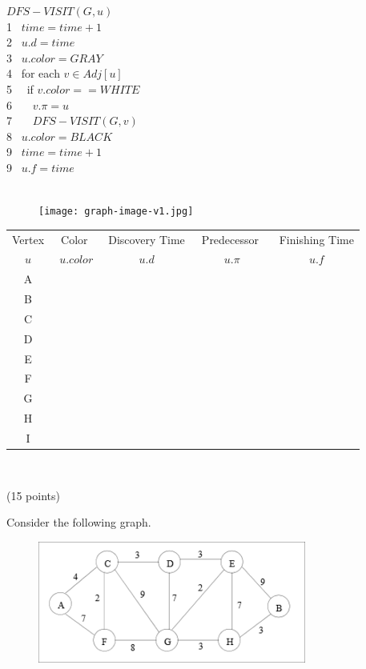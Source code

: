 \documentclass[12pt]{article}
\newcommand{\vs}{\vspace{2mm}}
\newcommand{\ha}{\hspace{5mm}}
\begin{document}
$DFS-VISIT(G,u)$ \\
1 \ha\ $time = time + 1$ \\
2 \ha\ $u.d = time$ \\
3 \ha\ $u.color = GRAY$ \\
4 \ha\ for each $v \in Adj[u] $ \\
5  \ha\ \ha\ if $v.color == WHITE$ \\
6 \ha\ \ha\ \ha\ $v.\pi= u$\\
7  \ha\ \ha\ \ha\ $DFS-VISIT(G,v)$ \\
8 \ha\  $u.color = BLACK$ \\
9 \ha\  $ time= time+1 $\\
9 \ha\  $ u.f = time $\\ \\

\begin{figure}[!h]
    \centering
    \texttt{[image: graph-image-v1.jpg]}
\end{figure}

\begin{tabular}{|c|c|c|c|c|} \hline
  Vertex  &  \ha\  Color  \ha\ &   Discovery Time  & \ha\ Predecessor \ha\  & Finishing Time \\
  $u$ & $u.color$ & $u.d$ & $u.\pi$ & $ u.f$\\ \hline
  A & & & & \\ \hline
  B & & & &\\ \hline
  C & & & &\\ \hline
  D & & & &\\ \hline
  E & & & & \\ \hline
  F & & & &\\ \hline
  G & & & &\\ \hline
  H & & & &\\ \hline
  I & & & &\\ \hline
\end{tabular}

\vs\
\vs\


\pagebreak


(15 points)

Consider the following graph.

\begin{figure}[!h]
\centering
\includegraphics[scale=.74]{graph-prims-kruksal.png}
\end{figure}
\end{document}
